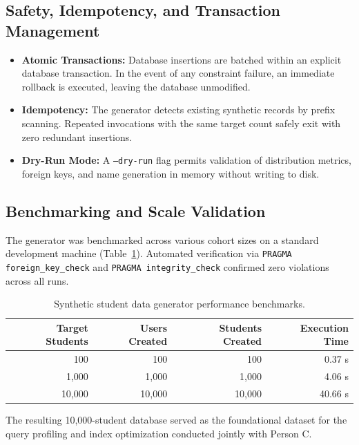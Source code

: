 \subsection{Safety, Idempotency, and Transaction Management}
\begin{itemize}
    \item \textbf{Atomic Transactions:} Database insertions are batched within an explicit database transaction. In the event of any constraint failure, an immediate rollback is executed, leaving the database unmodified.
    \item \textbf{Idempotency:} The generator detects existing synthetic records by prefix scanning. Repeated invocations with the same target count safely exit with zero redundant insertions.
    \item \textbf{Dry-Run Mode:} A \texttt{--dry-run} flag permits validation of distribution metrics, foreign keys, and name generation in memory without writing to disk.
\end{itemize}

\subsection{Benchmarking and Scale Validation}
The generator was benchmarked across various cohort sizes on a standard development machine (Table~\ref{tab:generator-benchmark}). Automated verification via \texttt{PRAGMA foreign\_key\_check} and \texttt{PRAGMA integrity\_check} confirmed zero violations across all runs.

\begin{table}[htbp]
\centering
\small
\begin{tabular}{|r|r|r|r|}
\hline
\textbf{Target Students} & \textbf{Users Created} & \textbf{Students Created} & \textbf{Execution Time} \\ \hline
100 & 100 & 100 & 0.37 s \\ \hline
1{,}000 & 1{,}000 & 1{,}000 & 4.06 s \\ \hline
10{,}000 & 10{,}000 & 10{,}000 & 40.66 s \\ \hline
\end{tabular}
\caption{Synthetic student data generator performance benchmarks.}
\label{tab:generator-benchmark}
\end{table}

The resulting 10{,}000-student database served as the foundational dataset for the query profiling and index optimization conducted jointly with Person C.
